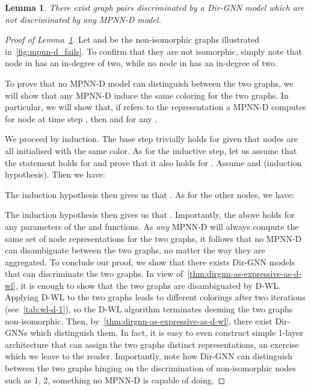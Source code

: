\documentclass{article}
\newcommand\oursacro{Dir-GNN}
\theoremstyle{plain}
\newtheorem{lemma}[theorem]{Lemma}
\theoremstyle{definition}
\theoremstyle{remark}
\begin{document}
\begin{lemma}\label{lemma:exists-graphs-distinguished-by-dirgnn-but-not-by-mpnn-d}
    There exist graph pairs discriminated by a \oursacro{} model which are not discriminated by any MPNN-D model.
\end{lemma}
\begin{proof}[Proof of Lemma~\ref{lemma:exists-graphs-distinguished-by-dirgnn-but-not-by-mpnn-d}]
    Let  and  be the non-isomorphic graphs illustrated in~\cref{fig:mpnn-d_fails}. To confirm that they are not isomorphic, simply note that node  in  has an in-degree of two, while no node in  has an in-degree of two. 
    
    To prove that no MPNN-D model can distinguish between the two graphs, we will show that any MPNN-D induce the same coloring for the two graphs. In particular, we will show that, if  refers to the representation a MPNN-D computes for node  at time step , then  and  for any .

    We proceed by induction. The base step trivially holds for  given that nodes are all initialised with the same color. As for the inductive step, let us assume that the statement holds for  and prove that it also holds for .
    Assume  and  (induction hypothesis).
    Then we have:
    
    The induction hypothesis then gives us that .
    As for the other nodes, we have:
    
    The induction hypothesis then gives us that . Importantly, the above holds for any parameters of the  and  functions. As \emph{any} MPNN-D will always compute the same set of node representations for the two graphs, it follows that no MPNN-D can disambiguate between the two graphs, no matter the way they are aggregated. To conclude our proof, we show that there exists \oursacro{} models that can discriminate the two graphs. In view of~\cref{thm:dirgnn-as-expressive-as-d-wl}, it is enough to show that the two graphs are disambiguated by D-WL.
    Applying D-WL to the two graphs leads to different colorings after two iterations (see~\cref{tab:wl-d-1}), so the D-WL algorithm terminates deeming the two graphs non-isomorphic. Then, by~\cref{thm:dirgnn-as-expressive-as-d-wl}, there exist \oursacro{}s which distinguish them. In fact, it is easy to even construct simple 1-layer architecture that can assign the two graphs distinct representations, an exercise which we leave to the reader. Importantly, note how \oursacro{} can distinguish between the two graphs hinging on the discrimination of non-isomorphic nodes such as 1, 2, something no MPNN-D is capable of doing.
\end{proof}
\end{document}
